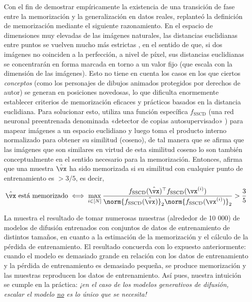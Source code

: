 \documentclass[../../book-main.tex]{subfiles}
\begin{document}
Con el fin de demostrar empíricamente la existencia de una transición de fase
entre la memorización y la generalización en datos reales,
\cite{pmlr-v235-zhang24cn} replanteó la definición de memorización
mediante el siguiente razonamiento. En el espacio de dimensiones muy elevadas de
las imágenes naturales, las distancias euclidianas entre puntos se vuelven mucho más
estrictas \cite{Wright-Ma-2022}, en el sentido de que, si dos imágenes no
coinciden a la perfección, a nivel de píxel, sus distancias euclidianas
se concentrarán en forma marcada en torno a un valor fijo (que escala con la
dimensión de las imágenes). Esto no tiene en cuenta los casos en los que ciertos
\textit{conceptos} (como los personajes de dibujos animados protegidos por derechos de autor) se
generan en posiciones novedosas, lo que dificulta enormemente establecer
criterios de memorización eficaces y prácticos basados en la distancia
euclidiana. Para solucionar esto, \cite{pmlr-v235-zhang24cn} utiliza una función específica
\(f_{\mathrm{SSCD}}\) (una red neuronal preentrenada
denominada «detector de copias autosupervisado» \cite{pizzi2022self})
para mapear imágenes a un espacio euclidiano y luego toma el producto interno
normalizado para obtener su similitud (coseno), de tal manera que se afirma que las imágenes que
son similares en virtud de esta similitud coseno lo son también
conceptualmente en el sentido necesario para la memorización. Entonces,
\cite{pmlr-v235-zhang24cn} afirma que una muestra \(\hat{\vx}\) ha sido memorizada si su
similitud con cualquier punto de entrenamiento es \(> 3/5\), es decir,
\begin{equation}\label{eq:diffusion_sscd_memorization_criterion}
    \hat{\vx}\ \text{está memorizado} \iff \max_{i \in [N]}
    \frac{f_{\mathrm{SSCD}}(\hat{\vx})^{\top}f_{\mathrm{SSCD}}(\vx^{(i)})}{\norm{f_{\mathrm{SSCD}}(\hat{\vx})}_{2}\norm{f_{\mathrm{SSCD}}(\vx^{(i)})}_{2}}
    > \frac{3}{5}
\end{equation}

La  muestra
el resultado de tomar numerosas muestras (alrededor de 10 000) de modelos de difusión
entrenados con conjuntos de datos de entrenamiento de distintos tamaños, en cuanto a
la estimación de la memorización y el cálculo de la pérdida de entrenamiento.
El resultado concuerda con lo expuesto anteriormente: cuando el modelo es
demasiado grande en relación con los datos de entrenamiento y la pérdida de entrenamiento es demasiado pequeña,
se produce memorización y las muestras reproducen los datos de entrenamiento. Así pues, nuestra
intuición se cumple en la práctica: \textit{¡en el caso de los modelos generativos de difusión, escalar
el modelo \underline{no} es lo único que se necesita!}
\end{document}

